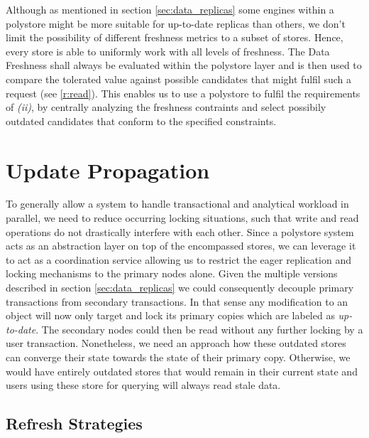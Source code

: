 Although as mentioned in section \ref{sec:data_replicas} some engines within a polystore might be more suitable for up-to-date replicas than others,
we don't limit the possibility of different freshness metrics to a subset of stores. Hence, every store is able to uniformly work with all levels of freshness.
The Data Freshness shall always be evaluated within the polystore layer and is then used to compare the tolerated value against possible candidates that might fulfil such a request 
(see \ref{r:read}). This enables us to use a polystore to fulfil the requirements of \textit{(ii)}, by centrally analyzing the freshness contraints and select possibily outdated 
candidates that conform to the specified constraints.







\section{Update Propagation}
\label{sec:propagation}

To generally allow a system to handle transactional and analytical workload in parallel, we need to reduce occurring locking situations,
such that write and read operations do not drastically interfere with each other.
Since a polystore system acts as an abstraction layer on top of the encompassed stores, we can leverage it to act as a coordination service 
allowing us to restrict the eager replication and locking mechanisms to the primary nodes alone.
Given the multiple versions described in section \ref{sec:data_replicas} we could consequently decouple primary transactions from 
secondary transactions. In that sense any modification to an object will now only target and lock its primary copies which are labeled as \emph{up-to-date}.
The secondary nodes could then be read without any further locking by a user transaction. 
Nonetheless, we need an approach how these outdated stores can converge their state towards the state of their primary copy.
Otherwise, we would have entirely outdated stores that would remain in their current state and users using these store for querying will always read stale data. 


\subsection{Refresh Strategies}
\label{sec:refresh_strategies}

